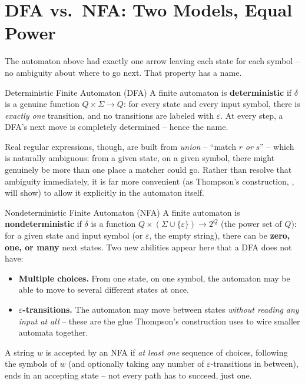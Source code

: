 \documentclass[full-course-notes.tex]{subfiles}
\begin{document}
\section{DFA vs.\ NFA: Two Models, Equal Power}
\label{sec:l5-dfa-vs-nfa}

\dbtag The automaton above had exactly one arrow leaving each state for each symbol -- no
ambiguity about where to go next. That property has a name.

\begin{defbox}{Deterministic Finite Automaton (DFA)}
A finite automaton is \textbf{deterministic} if $\delta$ is a genuine function
$Q \times \Sigma \to Q$: for every state and every input symbol, there is \emph{exactly one}
transition, and no transitions are labeled with $\varepsilon$. At every step, a DFA's next move
is completely determined -- hence the name.
\end{defbox}

Real regular expressions, though, are built from \emph{union} -- ``match $r$ \emph{or} $s$''
-- which is naturally ambiguous: from a given state, on a given symbol, there might genuinely be
more than one place a matcher could go. Rather than resolve that ambiguity immediately, it is
far more convenient (as Thompson's construction, , will show) to allow it
explicitly in the automaton itself.

\begin{defbox}{Nondeterministic Finite Automaton (NFA)}
A finite automaton is \textbf{nondeterministic} if $\delta$ is a function
$Q \times (\Sigma \cup \{\varepsilon\}) \to 2^{Q}$ (the power set of $Q$): for a given state and
input symbol (or $\varepsilon$, the empty string), there can be \textbf{zero, one, or many}
next states. Two new abilities appear here that a DFA does not have:
\begin{itemize}
  \item \textbf{Multiple choices.} From one state, on one symbol, the automaton may be able to
  move to several different states at once.
  \item \textbf{$\varepsilon$-transitions.} The automaton may move between states
  \emph{without reading any input at all} -- these are the glue Thompson's construction uses to
  wire smaller automata together.
\end{itemize}
A string $w$ is accepted by an NFA if \emph{at least one} sequence of choices, following the
symbols of $w$ (and optionally taking any number of $\varepsilon$-transitions in between), ends
in an accepting state -- not every path has to succeed, just one.
\end{defbox}
\end{document}

